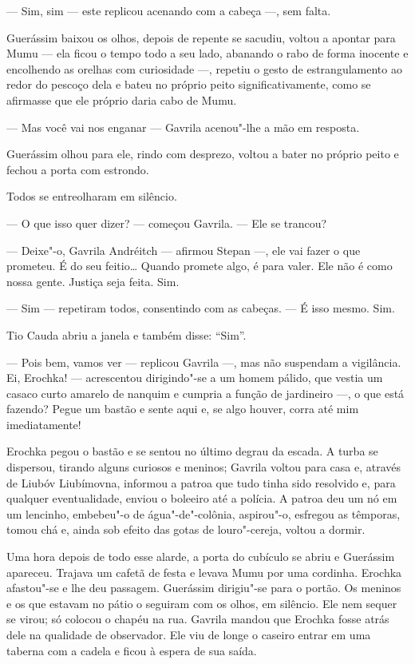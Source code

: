 --- Sim, sim --- este replicou acenando com a cabeça ---, sem falta.

Guerássim baixou os olhos, depois de repente se sacudiu, voltou a
apontar para Mumu --- ela ficou o tempo todo a seu lado, abanando o rabo
de forma inocente e encolhendo as orelhas com curiosidade ---, repetiu o
gesto de estrangulamento ao redor do pescoço dela e bateu no próprio
peito significativamente, como se afirmasse que ele próprio daria cabo
de Mumu.

--- Mas você vai nos enganar --- Gavrila acenou"-lhe a mão em resposta.

Guerássim olhou para ele, rindo com desprezo, voltou a bater no próprio
peito e fechou a porta com estrondo.

Todos se entreolharam em silêncio.

--- O que isso quer dizer? --- começou Gavrila. --- Ele se trancou?

--- Deixe"-o, Gavrila Andréitch --- afirmou Stepan ---, ele vai fazer o
que prometeu. É do seu feitio\ldots{} Quando promete algo, é para valer. Ele
não é como nossa gente. Justiça seja feita. Sim.

--- Sim --- repetiram todos, consentindo com as cabeças. --- É isso
mesmo. Sim.

Tio Cauda abriu a janela e também disse: ``Sim''.

--- Pois bem, vamos ver --- replicou Gavrila ---, mas não suspendam a
vigilância. Ei, Erochka! --- acrescentou dirigindo"-se a um homem pálido,
que vestia um casaco curto amarelo de nanquim e cumpria a função de
jardineiro ---, o que está fazendo? Pegue um bastão e sente aqui e, se
algo houver, corra até mim imediatamente!

Erochka pegou o bastão e se sentou no último degrau da escada. A turba
se dispersou, tirando alguns curiosos e meninos; Gavrila voltou para
casa e, através de Liubóv Liubímovna, informou a patroa que tudo tinha
sido resolvido e, para qualquer eventualidade, enviou o boleeiro até a
polícia. A patroa deu um nó em um lencinho, embebeu"-o de
água"-de"-colônia, aspirou"-o, esfregou as têmporas, tomou chá e, ainda sob
efeito das gotas de louro"-cereja, voltou a dormir.

Uma hora depois de todo esse alarde, a porta do cubículo se abriu e
Guerássim apareceu. Trajava um cafetã de festa e levava Mumu por uma
cordinha. Erochka afastou"-se e lhe deu passagem. Guerássim dirigiu"-se
para o portão. Os meninos e os que estavam no pátio o seguiram com os
olhos, em silêncio. Ele nem sequer se virou; só colocou o chapéu na rua.
Gavrila mandou que Erochka fosse atrás dele na qualidade de observador.
Ele viu de longe o caseiro entrar em uma taberna com a cadela e ficou à
espera de sua saída.

